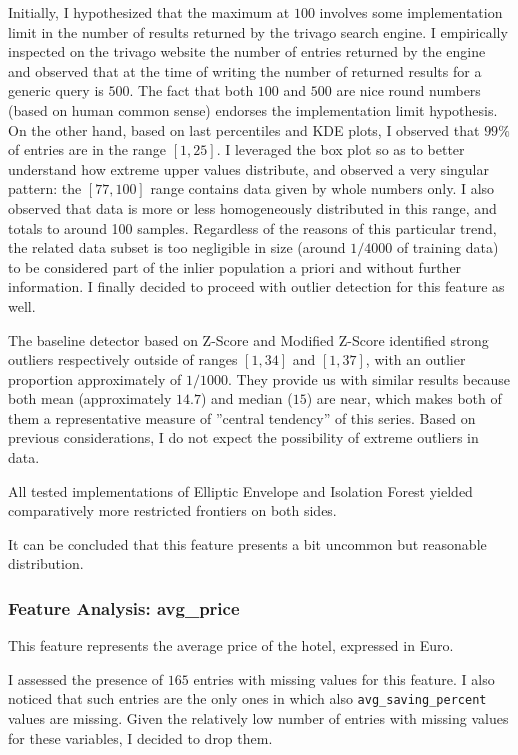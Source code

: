 \documentclass[preprint,12pt,3p]{elsarticle}
\begin{document}
Initially, I hypothesized that the maximum at $100$ involves some implementation limit in the number of results returned by the trivago search engine. I empirically inspected on the trivago website the number of entries returned by the engine and observed that at the time of writing the number of returned results for a generic query is $500$. The fact that both $100$ and $500$ are nice round numbers (based on human common sense) endorses the implementation limit hypothesis. On the other hand, based on last percentiles and KDE plots, I observed that $99\%$ of entries are in the range $[1,25]$. I leveraged the box plot so as to better understand how extreme upper values distribute, and observed a very singular pattern: the $[77,100]$ range contains data given by whole numbers only. I also observed that data is more or less homogeneously distributed in this range, and totals to around 100 samples. Regardless of the reasons of this particular trend, the related data subset is too negligible in size (around $1/4000$ of training data) to be considered part of the inlier population a priori and without further information. I finally decided to proceed with outlier detection for this feature as well.

The baseline detector based on Z-Score and Modified Z-Score identified strong outliers respectively outside of ranges $[1,34]$ and $[1,37]$, with an outlier proportion approximately of $1/1000$. They provide us with similar results because both mean (approximately $14.7$) and median ($15$) are near, which makes both of them a representative measure of ''central tendency'' of this series. Based on previous considerations, I do not expect the possibility of extreme outliers in data.

All tested implementations of Elliptic Envelope and Isolation Forest yielded comparatively more restricted frontiers on both sides.

It can be concluded that this feature presents a bit uncommon but reasonable distribution.

\subsubsection{Feature Analysis: avg\_price}
This feature represents the average price of the hotel, expressed in Euro.

I assessed the presence of $165$ entries with missing values for this feature. I also noticed that such entries are the only ones in which also \verb|avg_saving_percent| values are missing. Given the relatively low number of entries with missing values for these variables, I decided to drop them.
\end{document}
